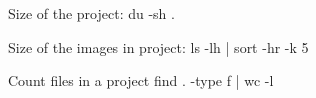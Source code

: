 \documentclass{article}
\begin{document}
Size of the project:
\bash[stdout]
du -sh .
\END

Size of the images in project:
\bash[stdout]
ls -lh | sort -hr -k 5
\END

Count files in a project
\bash[stdout]
find . -type f | wc -l

\END
\end{document}
